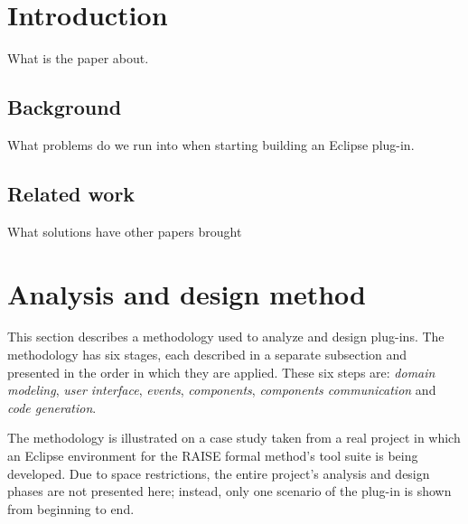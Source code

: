 \documentclass[conference]{IEEEtran}
\begin{document}

%
\IEEEpeerreviewmaketitle


\section{Introduction}
\label{sec:introduction}

What is the paper about.

%
\subsection{Background}
\label{sec:background}

What problems do we run into when starting building an Eclipse plug-in.

%
\subsection{Related work}
\label{sec:related-work}

What solutions have other papers brought

\section{Analysis and design method}
\label{sec:analys-design-meth}

This section describes a methodology used to analyze and design
plug-ins. The methodology has six stages, each described in a separate
subsection and presented in the order in which they are applied. These
six steps are: \emph{domain modeling}, \emph{user interface},
\emph{events}, \emph{components}, \emph{components communication} and
\emph{code generation}.

The methodology is illustrated on a case study taken from a real
project in which an Eclipse environment for the RAISE formal method's
tool suite is being developed. Due to space restrictions, the entire
project's analysis and design phases are not presented here; instead,
only one scenario of the plug-in is shown from beginning to end.
\end{document}
